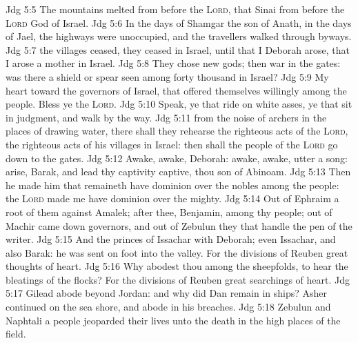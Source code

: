 \vs Jdg 5:5 The mountains melted from before the \textsc{Lord},  that Sinai from before the \textsc{Lord} God of Israel.
\vs Jdg 5:6 In the days of Shamgar the son of Anath, in the days of Jael, the highways were unoccupied, and the travellers walked through byways.
\vs Jdg 5:7  the villages ceased, they ceased in Israel, until that I Deborah arose, that I arose a mother in Israel.
\vs Jdg 5:8 They chose new gods; then  war in the gates: was there a shield or spear seen among forty thousand in Israel?
\vs Jdg 5:9 My heart  toward the governors of Israel, that offered themselves willingly among the people. Bless ye the \textsc{Lord}.
\vs Jdg 5:10 Speak, ye that ride on white asses, ye that sit in judgment, and walk by the way.
\vs Jdg 5:11  from the noise of archers in the places of drawing water, there shall they rehearse the righteous acts of the \textsc{Lord},  the righteous acts  of his villages in Israel: then shall the people of the \textsc{Lord} go down to the gates.
\vs Jdg 5:12 Awake, awake, Deborah: awake, awake, utter a song: arise, Barak, and lead thy captivity captive, thou son of Abinoam.
\vs Jdg 5:13 Then he made him that remaineth have dominion over the nobles among the people: the \textsc{Lord} made me have dominion over the mighty.
\vs Jdg 5:14 Out of Ephraim  a root of them against Amalek; after thee, Benjamin, among thy people; out of Machir came down governors, and out of Zebulun they that handle the pen of the writer.
\vs Jdg 5:15 And the princes of Issachar  with Deborah; even Issachar, and also Barak: he was sent on foot into the valley. For the divisions of Reuben  great thoughts of heart.
\vs Jdg 5:16 Why abodest thou among the sheepfolds, to hear the bleatings of the flocks? For the divisions of Reuben  great searchings of heart.
\vs Jdg 5:17 Gilead abode beyond Jordan: and why did Dan remain in ships? Asher continued on the sea shore, and abode in his breaches.
\vs Jdg 5:18 Zebulun and Naphtali  a people  jeoparded their lives unto the death in the high places of the field.

